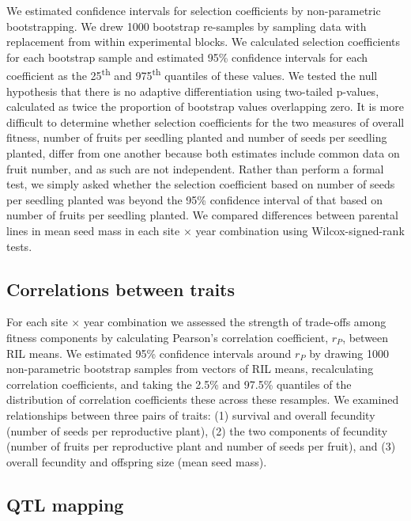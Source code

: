 \documentclass[12pt,]{article}
\begin{document}
We estimated confidence intervals for selection coefficients by non-parametric bootstrapping. We drew 1000 bootstrap re-samples by sampling data with replacement from within experimental blocks. We calculated selection coefficients for each bootstrap sample and estimated 95\% confidence intervals for each coefficient as the 25\textsuperscript{th} and 975\textsuperscript{th} quantiles of these values. We tested the null hypothesis that there is no adaptive differentiation using two-tailed p-values, calculated as twice the proportion of bootstrap values overlapping zero. It is more difficult to determine whether selection coefficients for the two measures of overall fitness, number of fruits per seedling planted and number of seeds per seedling planted, differ from one another because both estimates include common data on fruit number, and as such are not independent. Rather than perform a formal test, we simply asked whether the selection coefficient based on number of seeds per seedling planted was beyond the 95\% confidence interval of that based on number of fruits per seedling planted. We compared differences between parental lines in mean seed mass in each site × year combination using Wilcox-signed-rank tests.

\hypertarget{correlations-between-traits}{%
\subsection{Correlations between traits}\label{correlations-between-traits}}

For each site × year combination we assessed the strength of trade-offs among fitness components by calculating Pearson's correlation coefficient, \(r_P\), between RIL means. We estimated 95\% confidence intervals around \(r_P\) by drawing 1000 non-parametric bootstrap samples from vectors of RIL means, recalculating correlation coefficients, and taking the 2.5\% and 97.5\% quantiles of the distribution of correlation coefficients these across these resamples. We examined relationships between three pairs of traits: (1) survival and overall fecundity (number of seeds per reproductive plant), (2) the two components of fecundity (number of fruits per reproductive plant and number of seeds per fruit), and (3) overall fecundity and offspring size (mean seed mass).

\hypertarget{qtl-mapping}{%
\subsection{QTL mapping}\label{qtl-mapping}}
\end{document}

